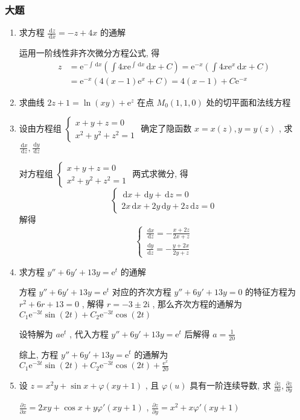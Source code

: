 \documentclass[cn,11pt,fancy,hide]{elegantbook}
\newcommand{\ee}{\mathrm{e}}
\newcommand{\dd}{\,\mathrm{d}}
\newcommand{\ii}{\mathrm{i}}
\begin{document}
\subsubsection{大题}
\begin{enumerate}
	\item 求方程 $\frac{\dd z}{\dd x}=-z+4x$ 的通解
	\begin{solution}
		运用一阶线性非齐次微分方程公式, 得
		\begin{align*}
			z&=\ee^{-\int\dd x}\left( \int 4x\ee^{\int \dd x}\dd x+C\right) =\ee^{-x}\left( \int 4x\ee^{x}\dd x+C\right) \\
			&=\ee^{-x}\left( 4(x-1)\ee^{x}+C\right) =4(x-1)+C\ee^{-x}
		\end{align*}
	\end{solution}
	\item 求曲线 $2z+1=\ln(xy)+\ee^z$ 在点 $M_{0}(1,1,0)$ 处的切平面和法线方程
	\item 设由方程组 $\begin{cases}
	x+y+z=0\\
	x^2+y^2+z^2=1
	\end{cases}$
	确定了隐函数 $x=x(z),y=y(z)$ , 求 $\frac{\dd x}{\dd z},\frac{\dd y}{\dd z}$
	\begin{solution}
		对方程组 $\begin{cases}
		x+y+z=0\\
		x^2+y^2+z^2=1
		\end{cases}$ 两式求微分, 得
		\begin{equation*}
			\begin{cases}
			\dd x+\dd y+\dd z=0\\
			2x\dd x+2y\dd y+2z\dd z=0
			\end{cases}
		\end{equation*}
		解得
		\begin{equation*}
			\begin{cases}
			\frac{\dd x}{\dd z}=-\frac{x+2z}{2x+z}\\
			\frac{\dd y}{\dd z}=-\frac{y+2x}{2y+z}
			\end{cases}
		\end{equation*}
	\end{solution}
	\item 求方程 $y''+6y'+13y=\ee^t$ 的通解
	\begin{solution}
		方程 $y''+6y'+13y=\ee^t$ 对应的齐次方程 $y''+6y'+13y=0$ 的特征方程为 $r^2+6r+13=0$ , 解得 $r=-3\pm2\ii$ , 那么齐次方程的通解为 $C_1\ee^{-3t}\sin(2t)+C_2\ee^{-3t}\cos(2t)$
		
		设特解为 $a\ee^{t}$ , 代入方程 $y''+6y'+13y=\ee^t$ 后解得 $a=\frac{1}{20}$
		
		综上, 方程 $y''+6y'+13y=\ee^t$ 的通解为 $C_1\ee^{-3t}\sin(2t)+C_2\ee^{-3t}\cos(2t)+\frac{\ee^x}{20}$
	\end{solution}
	\item 设 $z=x^2y+\sin x+\varphi(xy+1)$ , 且 $\varphi(u)$ 具有一阶连续导数, 求 $\frac{\partial z}{\partial x},\frac{\partial z}{\partial y}$
	\begin{solution}
		$\frac{\partial z}{\partial x}=2xy+\cos x+y\varphi'(xy+1)$ , $\frac{\partial z}{\partial y}=x^2+x\varphi'(xy+1)$
	\end{solution}
\end{enumerate}
\end{document}
